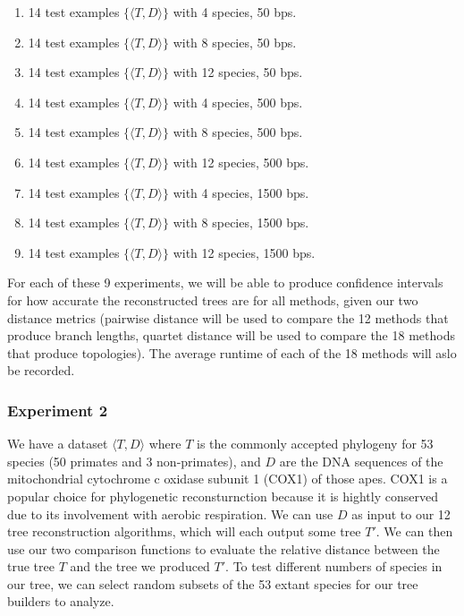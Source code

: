 \documentclass[10pt,twocolumn]{article}
\begin{document}
\begin{enumerate}
  \item 14 test examples $\{\langle T, D \rangle\}$ with 4 species, 50 bps.
  \item 14 test examples $\{\langle T, D \rangle\}$ with 8 species, 50 bps.
  \item 14 test examples $\{\langle T, D \rangle\}$ with 12 species, 50 bps.
  \item 14 test examples $\{\langle T, D \rangle\}$ with 4 species, 500 bps.
  \item 14 test examples $\{\langle T, D \rangle\}$ with 8 species, 500 bps.
  \item 14 test examples $\{\langle T, D \rangle\}$ with 12 species, 500 bps.
  \item 14 test examples $\{\langle T, D \rangle\}$ with 4 species, 1500 bps.
  \item 14 test examples $\{\langle T, D \rangle\}$ with 8 species, 1500 bps.
  \item 14 test examples $\{\langle T, D \rangle\}$ with 12 species, 1500 bps.
\end{enumerate}

For each of these 9 experiments, we will be able to produce confidence intervals for how
accurate the reconstructed trees are for all methods, given our two distance metrics
(pairwise distance will be used to compare the 12 methods that produce branch lengths,
quartet distance will be used to compare the 18 methods that produce topologies). The average 
runtime of each of the 18 methods will aslo be recorded.

\subsubsection*{Experiment 2}
We have a dataset $\langle T, D \rangle$ where $T$ is the commonly accepted phylogeny
for 53 species (50 primates and 3 non-primates), and $D$ are the DNA sequences of the mitochondrial cytochrome c oxidase 
subunit 1 (COX1) of those apes. COX1 is a popular choice for phylogenetic reconsturnction 
because it is hightly conserved due to its involvement with aerobic respiration. 
We can use $D$ as input to our 12 tree reconstruction algorithms, which will each 
output some tree $T'$. We can then use our two comparison functions to evaluate the 
relative distance between the true tree $T$ and the tree we produced $T'$. To test 
different numbers of species in our tree, we can select random subsets of the 53 extant species for 
our tree builders to analyze.
\end{document}
